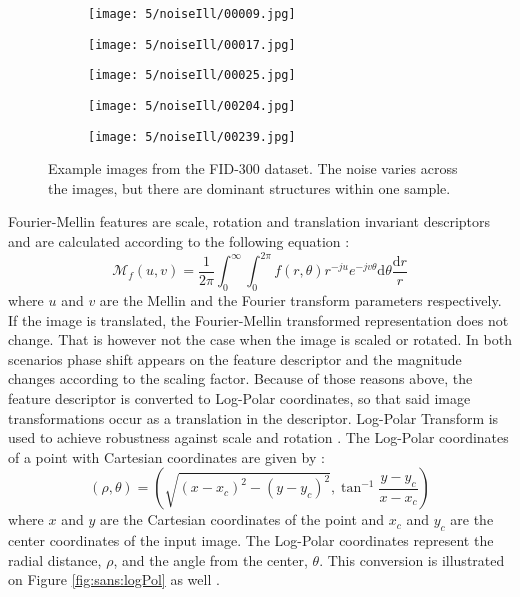 \documentclass[draft,final]{vutinfth} %
\begin{document}
\begin{figure}[h]
\centering
  \begin{subfigure}[t]{0.19\columnwidth}
    \centering
    \texttt{[image: 5/noiseIll/00009.jpg]}
  \end{subfigure}
  \begin{subfigure}[t]{0.19\columnwidth}
    \centering
    \texttt{[image: 5/noiseIll/00017.jpg]}
  \end{subfigure}
  \begin{subfigure}[t]{0.19\columnwidth}
    \centering
    \texttt{[image: 5/noiseIll/00025.jpg]}
  \end{subfigure}
  \begin{subfigure}[t]{0.19\columnwidth}
    \centering
    \texttt{[image: 5/noiseIll/00204.jpg]}
  \end{subfigure}
  \begin{subfigure}[t]{0.19\columnwidth}
    \centering
    \texttt{[image: 5/noiseIll/00239.jpg]}
  \end{subfigure}
\caption{Example images from the FID-300 dataset. The noise varies across the images, but there are dominant structures within one sample.}
\label{fig:sans:noiseIll}

\end{figure}
\par
Fourier-Mellin features are scale, rotation and translation invariant descriptors and are calculated according to the following equation \cite{kazik2011visual}:
\[\mathcal{M}_f(u,v) = \frac{1}{2\pi} \int_{0}^{\infty}\int_{0}^{2\pi} f(r, \theta)r^{-ju}e^{-jv\theta}\mathrm{d}\theta\frac{\mathrm{d}r}{r}\]
where $u$ and $v$ are the Mellin and the Fourier transform parameters respectively.
If the image is translated, the Fourier-Mellin transformed representation does not change.
That is however not the case when the image is scaled or rotated.
In both scenarios phase shift appears on the feature descriptor and the magnitude changes according to the scaling factor.
Because of those reasons above, the feature descriptor is converted to Log-Polar coordinates, so that said image transformations occur as a translation in the descriptor.
Log-Polar Transform is used to achieve robustness against scale and rotation  \cite{gueham2008automatic}.
The Log-Polar coordinates of a point with Cartesian coordinates are given by \cite{sarvaiya2012image}:
\[(\rho,\theta) = (\sqrt{(x-x_c)^2 - (y-y_c)^2}, \tan^{-1}\frac{y-y_c}{x-x_c})\]
where $x$ and $y$ are the Cartesian coordinates of the point and $x_c$ and $y_c$ are the center coordinates of the input image.
The Log-Polar coordinates represent the radial distance, $\rho$, and the angle from the center, $\theta$.
This conversion is illustrated on Figure \ref{fig:sans:logPol} as well \cite{sarvaiya2012image}.
\end{document}
